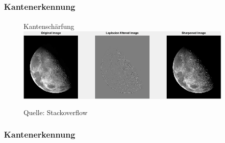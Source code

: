 \documentclass{beamer}
\begin{document}
\begin{frame}
    \frametitle{Kantenerkennung}
\framesubtitle{}
\begin{figure}[htp]
      \centering
Kantenschärfung \\
    \includegraphics[width=0.95\textwidth]{images/sharpening} 
      \caption{Quelle: Stackoverflow}
\end{figure}
 \end{frame}





\begin{frame}
    \frametitle{Kantenerkennung}
\framesubtitle{}
\begin{block}{}
\end{block}
 \end{frame}
\end{document}
